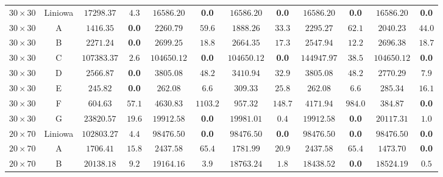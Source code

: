 \begin{table}[H]
\begin{center}
{\begin{tabular}{c|c||c|c||c|c||c|c||c|c||c|c}
            \hline
            $30 \times 30$ & Liniowa     & $17298.37$ & $4.3$                    & $16586.20$ & \textbf{0.0}         & $16586.20$ & \textbf{0.0}        & $16586.20$ & \textbf{0.0}        & $16586.20$ & \textbf{0.0} \\
            $30 \times 30$ & A           & $1416.35$ & \textbf{0.0}                     & $2260.79$ & $59.6$       & $1888.26$ & $33.3$        & $2295.27$ & $62.1$        & $2040.23$ & $44.0$ \\
            $30 \times 30$ & B           & $2271.24$ & \textbf{0.0}                     & $2699.25$ & $18.8$         & $2664.35$ & $17.3$        & $2547.94$ & $12.2$         & $2696.38$ & $18.7$ \\
            $30 \times 30$ & C           & $107383.37$ & $2.6$                   & $104650.12$ & \textbf{0.0}        & $104650.12$ & \textbf{0.0}       & $144947.97$ & $38.5$      & $104650.12$ & \textbf{0.0} \\
            $30 \times 30$ & D           & $2566.87$ & \textbf{0.0}                     & $3805.08$ & $48.2$         & $3410.94$ & $32.9$        & $3805.08$ & $48.2$        & $2770.29$ & $7.9$ \\
            $30 \times 30$ & E           & $245.82$ & \textbf{0.0}                      & $262.08$ & $6.6$           & $309.33$ & $25.8$         & $262.08$ & $6.6$          & $285.34$ & $16.1$ \\
            $30 \times 30$ & F           & $604.63$ & $57.1$                     & $4630.83$ & $1103.2$       & $957.32$ & $148.7$        & $4171.94$ & $984.0$       & $384.87$ & \textbf{0.0} \\
            $30 \times 30$ & G           & $23820.57$ & $19.6$                   & $19912.58$ & \textbf{0.0}         & $19981.01$ & $0.4$        & $19912.58$ & \textbf{0.0}        & $20117.31$ & $1.0$ \\
            \hline
            $20 \times 70$ & Liniowa     & $102803.27$ & $4.4$                   & $98476.50$ & \textbf{0.0}         & $98476.50$ & \textbf{0.0}        & $98476.50$ & \textbf{0.0}        & $98476.50$ & \textbf{0.0} \\
            $20 \times 70$ & A           & $1706.41$ & $15.8$                    & $2437.58$ & $65.4$         & $1781.99$ & $20.9$        & $2437.58$ & $65.4$        & $1473.70$ & \textbf{0.0} \\
            $20 \times 70$ & B           & $20138.18$ & $9.2$                    & $19164.16$ & $3.9$         & $18763.24$ & $1.8$        & $18438.52$ & \textbf{0.0}        & $18524.19$ & $0.5$ \\

\end{tabular}}
\end{center}
\end{table}
